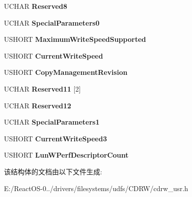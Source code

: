 \begin{DoxyCompactItemize}
U\+C\+H\+AR {\bfseries Reserved8}
\item 
\mbox{\label{struct___g_e_t___c_a_p_a_b_i_l_i_t_i_e_s__3___u_s_e_r___o_u_t_a1febd4d37c89d2c289e589700ad9c111}} 
U\+C\+H\+AR {\bfseries Special\+Parameters0}
\item 
\mbox{\label{struct___g_e_t___c_a_p_a_b_i_l_i_t_i_e_s__3___u_s_e_r___o_u_t_a55b41135c8defed363c165e82370a43d}} 
U\+S\+H\+O\+RT {\bfseries Maximum\+Write\+Speed\+Supported}
\item 
\mbox{\label{struct___g_e_t___c_a_p_a_b_i_l_i_t_i_e_s__3___u_s_e_r___o_u_t_a7602ed79c115d89c43c6318672702c13}} 
U\+S\+H\+O\+RT {\bfseries Current\+Write\+Speed}
\item 
\mbox{\label{struct___g_e_t___c_a_p_a_b_i_l_i_t_i_e_s__3___u_s_e_r___o_u_t_a1eb79fcd419a02232f711ea8c2e30b71}} 
U\+S\+H\+O\+RT {\bfseries Copy\+Management\+Revision}
\item 
\mbox{\label{struct___g_e_t___c_a_p_a_b_i_l_i_t_i_e_s__3___u_s_e_r___o_u_t_af08276523a8482bca8b91412d930cbc6}} 
U\+C\+H\+AR {\bfseries Reserved11} \mbox{[}2\mbox{]}
\item 
\mbox{\label{struct___g_e_t___c_a_p_a_b_i_l_i_t_i_e_s__3___u_s_e_r___o_u_t_a21f58d820ebbc31fcd6fedea7a86291d}} 
U\+C\+H\+AR {\bfseries Reserved12}
\item 
\mbox{\label{struct___g_e_t___c_a_p_a_b_i_l_i_t_i_e_s__3___u_s_e_r___o_u_t_aa66fe4251015bba4eccd72512fb00622}} 
U\+C\+H\+AR {\bfseries Special\+Parameters1}
\item 
\mbox{\label{struct___g_e_t___c_a_p_a_b_i_l_i_t_i_e_s__3___u_s_e_r___o_u_t_a37d0543f70eefcf7169b47a163d9c999}} 
U\+S\+H\+O\+RT {\bfseries Current\+Write\+Speed3}
\item 
\mbox{\label{struct___g_e_t___c_a_p_a_b_i_l_i_t_i_e_s__3___u_s_e_r___o_u_t_acccbb94c36e78b017eff6d9df64f4a66}} 
U\+S\+H\+O\+RT {\bfseries Lun\+W\+Perf\+Descriptor\+Count}
\end{DoxyCompactItemize}


该结构体的文档由以下文件生成\+:\begin{DoxyCompactItemize}
\item 
E\+:/\+React\+O\+S-\/0../drivers/filesystems/udfs/\+C\+D\+R\+W/cdrw\+\_\+usr.\+h\end{DoxyCompactItemize}
